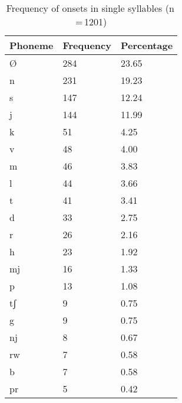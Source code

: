\begin{table}[pth]\centering
\caption[Frequency of onsets in single syllables]{Frequency of onsets in single syllables (n\,=\,1201)}
\begin{tabu} to 0.5\textwidth{X X[c] X[c]}
\tableheaderfont\toprule
Phoneme
	& Frequency
	& Percentage
	\\
	
\toprule

Ø
	& 284
	& 23.65\pct
	\\

\midrule

n
	& 231
	& 19.23\pct
	\\

s
	& 147
	& 12.24\pct
	\\

j
	& 144
	& 11.99\pct
	\\

k
	& 51
	& 4.25\pct
	\\

v
	& 48
	& 4.00\pct
	\\

m
	& 46
	& 3.83\pct
	\\

l
	& 44
	& 3.66\pct
	\\

t
	& 41
	& 3.41\pct
	\\

d
	& 33
	& 2.75\pct
	\\

r
	& 26
	& 2.16\pct
	\\

h
	& 23
	& 1.92\pct
	\\

mj
	& 16
	& 1.33\pct
	\\

p
	& 13
	& 1.08\pct
	\\

tʃ
	& 9
	& 0.75\pct
	\\

g
	& 9
	& 0.75\pct
	\\

nj
	& 8
	& 0.67\pct
	\\

rw
	& 7
	& 0.58\pct
	\\

b
	& 7
	& 0.58\pct
	\\

pr
	& 5
	& 0.42\pct
	\\


\end{tabu}
\end{table}
